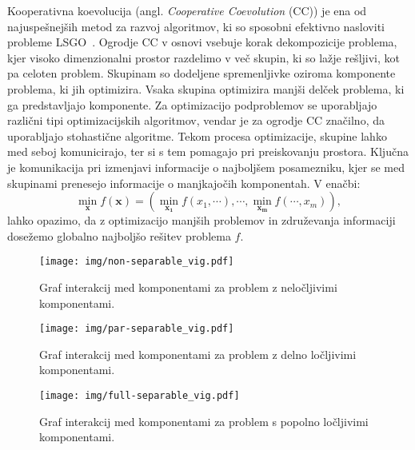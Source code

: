 Kooperativna koevolucija (angl. \textit{Cooperative Coevolution} (CC)) je ena od najuspešnejših metod za razvoj algoritmov, ki so sposobni efektivno nasloviti probleme LSGO~\cite{bib:metaheuristic_lsgo}.
Ogrodje CC v osnovi vsebuje korak dekompozicije problema, kjer visoko dimenzionalni prostor razdelimo v več skupin, ki so lažje rešljivi, kot pa celoten problem.
Skupinam so dodeljene spremenljivke oziroma komponente problema, ki jih optimizira.
Vsaka skupina optimizira manjši delček problema, ki ga predstavljajo komponente.
Za optimizacijo podproblemov se uporabljajo različni tipi optimizacijskih algoritmov, vendar je za ogrodje CC značilno, da uporabljajo stohastične algoritme.
Tekom procesa optimizacije, skupine lahko med seboj komunicirajo, ter si s tem pomagajo pri preiskovanju prostora.
Ključna je komunikacija pri izmenjavi informacije o najboljšem posamezniku, kjer se med skupinami prenesejo informacije o manjkajočih komponentah.
V enačbi:
\begin{equation}
    \min_{\mathbf{x}}{f(\mathbf{x})} = \left( \min_{\mathbf{x_1}}{f(x_1,\cdots)}, \cdots , \min_{\mathbf{x_m}}{f(\cdots, x_m)} \right), \label{eq:devide_opt_func}
\end{equation}
lahko opazimo, da z optimizacijo manjših problemov in združevanja informaciji dosežemo globalno najboljšo rešitev problema $f$.

\begin{figure}[ht]
    \centering
    \texttt{[image: img/non-separable\_vig.pdf]}
    \caption{Graf interakcij med komponentami za problem z neločljivimi komponentami.}\label{fig:non_separable}
\end{figure}

\begin{figure}[ht]
    \centering
    \texttt{[image: img/par-separable\_vig.pdf]}
    \caption{Graf interakcij med komponentami za problem z delno ločljivimi komponentami.}\label{fig:par_separable}
\end{figure}

\begin{figure}[ht]
    \centering
    \texttt{[image: img/full-separable\_vig.pdf]}
    \caption{Graf interakcij med komponentami za problem s popolno ločljivimi komponentami.}\label{fig:full_separable}
\end{figure}

